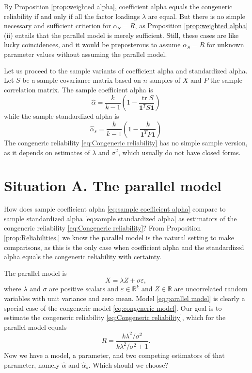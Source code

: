 \documentclass[twoside]{article}
\DeclareMathOperator{\tr}{tr}
\begin{document}
By Proposition \ref{prop:weighted alpha}, coefficient alpha equals the congeneric reliability if and only if all the factor loadings $\lambda$ are equal. But there is no simple necessary and sufficient criterion for $\alpha_S =  R$, as Proposition \ref{prop:weighted alpha} (ii) entails that the parallel model is merely sufficient. Still, these cases are like lucky coincidences, and it would be preposterous to assume $\alpha_S =  R$ for unknown parameter values without assuming the parallel model.

Let us proceed to the sample variants of coefficient alpha and standardized
alpha. Let $S$ be a sample covariance matrix based on
$n$ samples of $X$ and $P$ the sample correlation matrix.
The sample coefficient alpha is 
\begin{equation}
\hat{\alpha}=\frac{k}{k-1}\left(1-\frac{\tr{S}}{\boldsymbol{1}^{T}S\boldsymbol{1}}\right)\label{eq:sample coefficient alpha}
\end{equation}
while the sample standardized alpha is
\begin{equation}
\hat{\alpha}_s=\frac{k}{k-1}\left(1-\frac{k}{\boldsymbol{1}^{T}P\boldsymbol{1}}\right)\label{eq:sample standardized alpha}
\end{equation}
The congeneric reliability \eqref{eq:Congeneric reliability} has no
simple sample version, as it depends on estimates of $\lambda$ and
$\sigma^2$, which usually do not have closed forms.

\section{Situation A. The parallel model}
\label{sec:argument A}

How does sample coefficient alpha \eqref{eq:sample coefficient alpha} compare to sample standardized alpha \eqref{eq:sample standardized alpha} as estimators of the congeneric reliability \eqref{eq:Congeneric reliability}? From Proposition \ref{prop:Reliabilities.} we know the parallel model is the natural setting to make comparisons, as this is the only case when coefficient alpha and the standardized alpha equals the congeneric reliability with certainty.

The parallel model is
\begin{equation}
\label{eq:parallel model}
X = \lambda Z + \sigma\varepsilon,
\end{equation}
where $\lambda$ and $\sigma$ are positive scalars and $\varepsilon\in\mathbb{R}^k$ and $Z\in\mathbb{R}$ are uncorrelated random variables with unit variance and zero mean. Model \eqref{eq:parallel model} is clearly a special case of the congeneric model \eqref{eq:congeneric model}. Our goal is to estimate the congeneric reliability \eqref{eq:Congeneric reliability}, which for the parallel model equals
\begin{equation}
\label{eq:parallel_omega}
 R = \frac{k\lambda^2/\sigma^2}{k\lambda^2/\sigma^2 + 1}.
\end{equation}
Now we have a model, a parameter, and two competing estimators of that parameter, namely $\hat{\alpha}$ and $\hat{\alpha}_s$. Which should we choose? 
\end{document}
